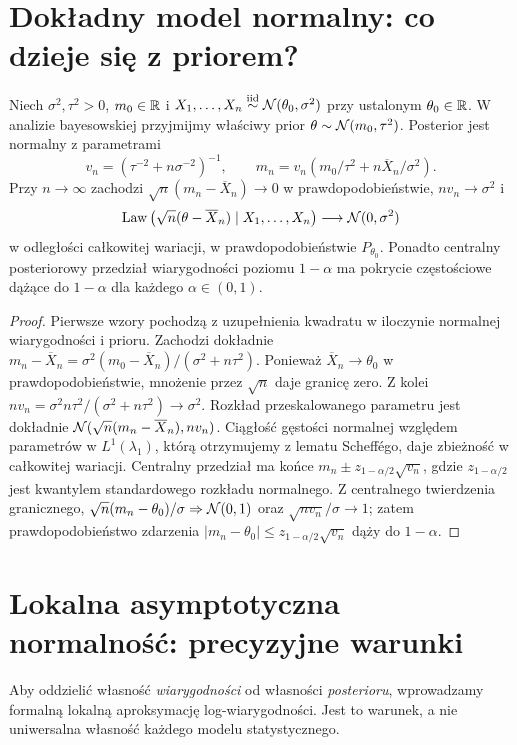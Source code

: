 \section{Dokładny model normalny: co dzieje się z priorem?}
\begin{twierdzenie}
\label{thm:normal-conjugate-bvm}
Niech $\sigma^2,\tau^2>0$, $m_0\in\mathbb R$ i
$X_1,\ldots,X_n\mathrel{\overset{\mathrm{iid}}\sim}\mathcal N(\theta_0,\sigma^2)$
przy ustalonym $\theta_0\in\mathbb R$.
W analizie bayesowskiej przyjmijmy właściwy prior
$\theta\sim\mathcal N(m_0,\tau^2)$. Posterior jest normalny
z parametrami
\[
 v_n=(\tau^{-2}+n\sigma^{-2})^{-1},\qquad
 m_n=v_n\left(m_0/\tau^2+n\overline X_n/\sigma^2\right).
\]
Przy $n\to\infty$ zachodzi
$\sqrt n(m_n-\overline X_n)\to0$ w prawdopodobieństwie,
$n v_n\to\sigma^2$ i
\[
 \operatorname{Law}\big(\sqrt n(\theta-\overline X_n)\mid X_1,\ldots,X_n\big)
 \longrightarrow\mathcal N(0,\sigma^2)
\]
w odległości całkowitej wariacji, w prawdopodobieństwie
$P_{\theta_0}$. Ponadto centralny posteriorowy przedział
wiarygodności poziomu $1-\alpha$ ma pokrycie częstościowe
dążące do $1-\alpha$ dla każdego $\alpha\in(0,1)$.
\end{twierdzenie}
\begin{proof}
Pierwsze wzory pochodzą z uzupełnienia kwadratu
w iloczynie normalnej wiarygodności i prioru.
Zachodzi dokładnie
$m_n-\overline X_n=\sigma^2(m_0-\overline X_n)/
(\sigma^2+n\tau^2)$.
Ponieważ $\overline X_n\to\theta_0$ w prawdopodobieństwie,
mnożenie przez $\sqrt n$ daje granicę zero.
Z kolei $nv_n=\sigma^2n\tau^2/(\sigma^2+n\tau^2)\to\sigma^2$.
Rozkład przeskalowanego parametru jest dokładnie
$\mathcal N(\sqrt n(m_n-\overline X_n),nv_n)$.
Ciągłość gęstości normalnej względem parametrów
w $L^1(\lambda_1)$, którą otrzymujemy z lematu Scheffégo,
daje zbieżność w całkowitej wariacji.
Centralny przedział ma końce
$m_n\pm z_{1-\alpha/2}\sqrt{v_n}$,
gdzie $z_{1-\alpha/2}$ jest kwantylem standardowego
rozkładu normalnego. Z centralnego twierdzenia granicznego,
$\sqrt n(m_n-\theta_0)/\sigma\Rightarrow\mathcal N(0,1)$
oraz $\sqrt{nv_n}/\sigma\to1$; zatem prawdopodobieństwo
zdarzenia $|m_n-\theta_0|\le z_{1-\alpha/2}\sqrt{v_n}$
dąży do $1-\alpha$.
\end{proof}

\section{Lokalna asymptotyczna normalność: precyzyjne warunki}
Aby oddzielić własność \emph{wiarygodności} od własności
\emph{posterioru}, wprowadzamy formalną lokalną aproksymację
log-wiarygodności. Jest to warunek, a nie uniwersalna
własność każdego modelu statystycznego.

